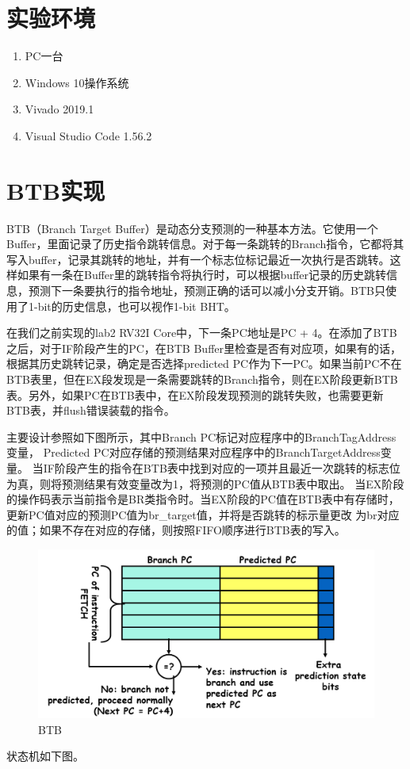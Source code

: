 \documentclass{ctexart}
\begin{document}
\section{\hei 实验环境}
\begin{enumerate}
    \item PC一台
    \item Windows 10操作系统
    \item Vivado 2019.1
    \item Visual Studio Code 1.56.2
\end{enumerate}

\section{\hei BTB实现}
BTB（Branch Target Buffer）是动态分支预测的一种基本方法。它使用一个Buffer，里面记录了历史指令跳转信息。对于每一条跳转的Branch指令，它都将其写入buffer，记录其跳转的地址，并有一个标志位标记最近一次执行是否跳转。这样如果有一条在Buffer里的跳转指令将执行时，可以根据buffer记录的历史跳转信息，预测下一条要执行的指令地址，预测正确的话可以减小分支开销。BTB只使用了1-bit的历史信息，也可以视作1-bit BHT。
\par

在我们之前实现的lab2 RV32I Core中，下一条PC地址是PC + 4。在添加了BTB之后，对于IF阶段产生的PC，在BTB Buffer里检查是否有对应项，如果有的话，根据其历史跳转记录，确定是否选择predicted PC作为下一PC。如果当前PC不在BTB表里，但在EX段发现是一条需要跳转的Branch指令，则在EX阶段更新BTB表。另外，如果PC在BTB表中，在EX阶段发现预测的跳转失败，也需要更新BTB表，并flush错误装载的指令。
\par
主要设计参照如下图所示，其中Branch PC标记对应程序中的BranchTagAddress变量， Predicted PC对应存储的预测结果对应程序中的BranchTargetAddress变量。
当IF阶段产生的指令在BTB表中找到对应的一项并且最近一次跳转的标志位为真，则将预测结果有效变量改为1，将预测的PC值从BTB表中取出。
当EX阶段的操作码表示当前指令是BR类指令时。当EX阶段的PC值在BTB表中有存储时，更新PC值对应的预测PC值为br\_target值，并将是否跳转的标示量更改
为br对应的值；如果不存在对应的存储，则按照FIFO顺序进行BTB表的写入。\par
\begin{figure}[H]
    \centering
    \includegraphics[scale=0.45]{btb.png}
    \caption{BTB}
\end{figure}
状态机如下图。
\par
\end{document}
